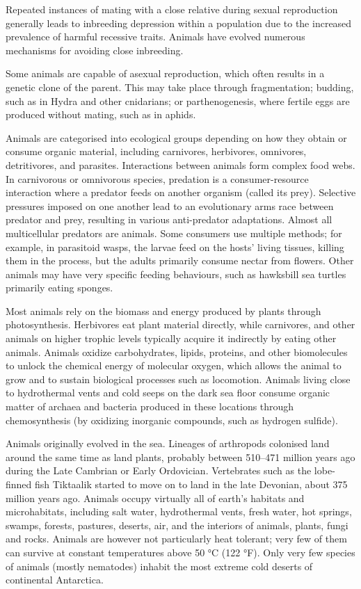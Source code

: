 Repeated instances of mating with a close relative during sexual reproduction generally leads to inbreeding depression within a population due to the increased prevalence of harmful recessive traits. Animals have evolved numerous mechanisms for avoiding close inbreeding.

Some animals are capable of asexual reproduction, which often results in a genetic clone of the parent. This may take place through fragmentation; budding, such as in Hydra and other cnidarians; or parthenogenesis, where fertile eggs are produced without mating, such as in aphids.

Animals are categorised into ecological groups depending on how they obtain or consume organic material, including carnivores, herbivores, omnivores, detritivores, and parasites. Interactions between animals form complex food webs. In carnivorous or omnivorous species, predation is a consumer-resource interaction where a predator feeds on another organism (called its prey). Selective pressures imposed on one another lead to an evolutionary arms race between predator and prey, resulting in various anti-predator adaptations. Almost all multicellular predators are animals. Some consumers use multiple methods; for example, in parasitoid wasps, the larvae feed on the hosts' living tissues, killing them in the process, but the adults primarily consume nectar from flowers. Other animals may have very specific feeding behaviours, such as hawksbill sea turtles primarily eating sponges.

Most animals rely on the biomass and energy produced by plants through photosynthesis. Herbivores eat plant material directly, while carnivores, and other animals on higher trophic levels typically acquire it indirectly by eating other animals. Animals oxidize carbohydrates, lipids, proteins, and other biomolecules to unlock the chemical energy of molecular oxygen, which allows the animal to grow and to sustain biological processes such as locomotion. Animals living close to hydrothermal vents and cold seeps on the dark sea floor consume organic matter of archaea and bacteria produced in these locations through chemosynthesis (by oxidizing inorganic compounds, such as hydrogen sulfide).

Animals originally evolved in the sea. Lineages of arthropods colonised land around the same time as land plants, probably between 510--471 million years ago during the Late Cambrian or Early Ordovician. Vertebrates such as the lobe-finned fish Tiktaalik started to move on to land in the late Devonian, about 375 million years ago. Animals occupy virtually all of earth's habitats and microhabitats, including salt water, hydrothermal vents, fresh water, hot springs, swamps, forests, pastures, deserts, air, and the interiors of animals, plants, fungi and rocks. Animals are however not particularly heat tolerant; very few of them can survive at constant temperatures above 50 °C (122 °F). Only very few species of
animals (mostly nematodes) inhabit the most extreme cold deserts of continental Antarctica.



